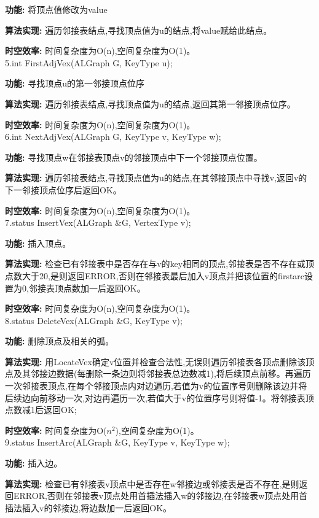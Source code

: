 \documentclass[supercite]{Experimental_Report}
\theoremstyle{definition}
\begin{document}
\textbf{功能: }将顶点值修改为value

\textbf{算法实现: }遍历邻接表结点,寻找顶点值为u的结点,将value赋给此结点。

\textbf{时空效率: }时间复杂度为O(n),空间复杂度为O(1)。\\

5.int FirstAdjVex(ALGraph G, KeyType u);

\textbf{功能: }寻找顶点u的第一邻接顶点位序

\textbf{算法实现: }遍历邻接表结点,寻找顶点值为u的结点,返回其第一邻接顶点位序。

\textbf{时空效率: }时间复杂度为O(n),空间复杂度为O(1)。\\

6.int NextAdjVex(ALGraph G, KeyType v, KeyType w);

\textbf{功能: }寻找顶点w在邻接表顶点v的邻接顶点中下一个邻接顶点位置。

\textbf{算法实现: }遍历邻接表结点,寻找顶点值为u的结点,在其邻接顶点中寻找v,返回v的下一邻接顶点位序后返回OK。

\textbf{时空效率: }时间复杂度为O(n),空间复杂度为O(1)。\\

7.status InsertVex(ALGraph \&G, VertexType v);

\textbf{功能: }插入顶点。

\textbf{算法实现: }检查已有邻接表中是否存在与v的key相同的顶点,邻接表是否不存在或顶点数大于20,是则返回ERROR,否则在邻接表最后加入v顶点并把该位置的firstarc设置为0,邻接表顶点数加一后返回OK。

\textbf{时空效率: }时间复杂度为O(n),空间复杂度为O(1)。\\

8.status DeleteVex(ALGraph \&G, KeyType v);

\textbf{功能: }删除顶点及相关的弧。

\textbf{算法实现: }用LocateVex确定v位置并检查合法性,无误则遍历邻接表各顶点删除该顶点及其邻接边数据(每删除一条边则将邻接表总边数减1),将后续顶点前移。再遍历一次邻接表顶点,在每个邻接顶点内对边遍历,若值为v的位置序号则删除该边并将后续边向前移动一次,对边再遍历一次,若值大于v的位置序号则将值-1。将邻接表顶点数减1后返回OK;

\textbf{时空效率: }时间复杂度为O($n^{2}$),空间复杂度为O(1)。\\

9.status InsertArc(ALGraph \&G, KeyType v, KeyType w);

\textbf{功能: }插入边。

\textbf{算法实现: }检查已有邻接表v顶点中是否存在w邻接边或邻接表是否不存在,是则返回ERROR,否则在邻接表v顶点处用首插法插入w的邻接边,在邻接表w顶点处用首插法插入v的邻接边,将边数加一后返回OK。
\end{document}
